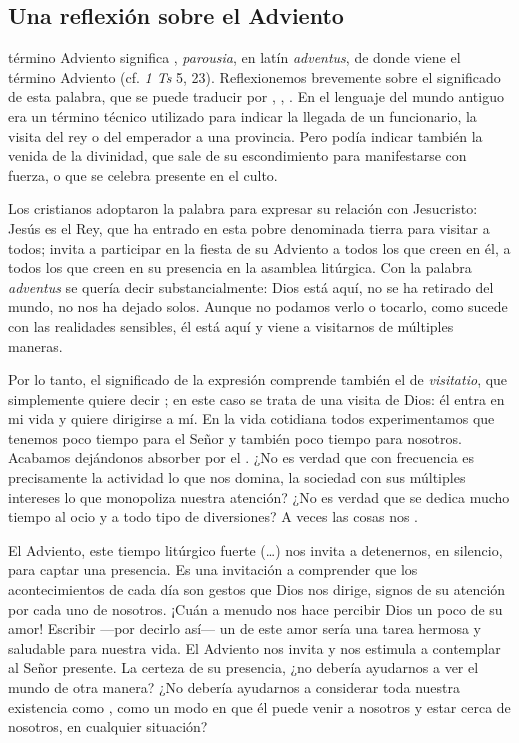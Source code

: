 \begin{introstyle}
	\newsection
	\section{Una reflexión sobre el Adviento}
	
	
	 término Adviento significa , \emph{parousia}, en latín \emph{adventus}, de donde viene el término Adviento (cf. \emph{1 Ts} 5, 23). Reflexionemos brevemente sobre el significado de esta palabra, que se puede traducir por , , . En el lenguaje del mundo antiguo era un término técnico utilizado para indicar la llegada de un funcionario, la visita del rey o del emperador a una provincia. Pero podía indicar también la venida de la divinidad, que sale de su escondimiento para manifestarse con fuerza, o que se celebra presente en el culto. 
	
	Los cristianos adoptaron la palabra  para expresar su relación con Jesucristo: Jesús es el Rey, que ha entrado en esta pobre  denominada tierra para visitar a todos; invita a participar en la fiesta de su Adviento a todos los que creen en él, a todos los que creen en su presencia en la asamblea litúrgica. Con la palabra \emph{adventus} se quería decir substancialmente: Dios está aquí, no se ha retirado del mundo, no nos ha dejado solos. Aunque no podamos verlo o tocarlo, como sucede con las realidades sensibles, él está aquí y viene a visitarnos de múltiples maneras.
	
	Por lo tanto, el significado de la expresión  comprende también el de \emph{visitatio}, que simplemente quiere decir ; en este caso se trata de una visita de Dios: él entra en mi vida y quiere dirigirse a mí. En la vida cotidiana todos experimentamos que tenemos poco tiempo para el Señor y también poco tiempo para nosotros. Acabamos dejándonos absorber por el . ¿No es verdad que con frecuencia es precisamente la actividad lo que nos domina, la sociedad con sus múltiples intereses lo que monopoliza nuestra atención? ¿No es verdad que se dedica mucho tiempo al ocio y a todo tipo de diversiones? A veces las cosas nos .
	
	El Adviento, este tiempo litúrgico fuerte (\ldots{}) nos invita a detenernos, en silencio, para captar una presencia. Es una invitación a comprender que los acontecimientos de cada día son gestos que Dios nos dirige, signos de su atención por cada uno de nosotros. ¡Cuán a menudo nos hace percibir Dios un poco de su amor! Escribir ---por decirlo así--- un  de este amor sería una tarea hermosa y saludable para nuestra vida. El Adviento nos invita y nos estimula a contemplar al Señor presente. La certeza de su presencia, ¿no debería ayudarnos a ver el mundo de otra manera? ¿No debería ayudarnos a considerar toda nuestra existencia como , como un modo en que él puede venir a nosotros y estar cerca de nosotros, en cualquier situación?
	

\end{introstyle}
